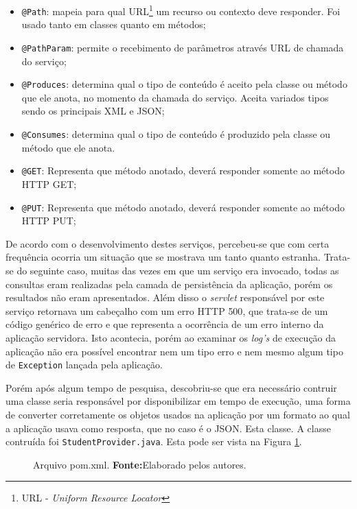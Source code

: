 	\begin{itemize}
	  \item \texttt{@Path}: mapeia para qual URL\footnote{URL - \textit{Uniform
	  Resource Locator}} um recurso ou contexto deve responder. Foi usado tanto em
	  classes quanto em métodos;
	  \item \texttt{@PathParam}: permite o recebimento de parâmetros através URL de
	  chamada do serviço;
	  \item \texttt{@Produces}: determina qual o tipo de conteúdo é aceito pela
	  classe ou método que ele anota, no momento da chamada do serviço. Aceita
	  variados tipos sendo os principais XML e JSON;
	  \item \texttt{@Consumes}: determina qual o tipo de conteúdo é produzido pela
	  classe ou método que ele anota. 
	  \item \texttt{@GET}: Representa que método anotado, deverá responder somente
	  ao método HTTP GET;
	  \item \texttt{@PUT}: Representa que método anotado, deverá responder somente
	  ao método HTTP PUT;
	\end{itemize}
	
	\par De acordo com o desenvolvimento destes serviços, percebeu-se que com certa
frequência ocorria um situação que se mostrava um tanto quanto estranha.
Trata-se do seguinte caso, muitas das vezes em que um serviço era invocado,
todas as consultas eram realizadas pela camada de persistência da aplicação,
porém os resultados não eram apresentados. Além disso o \textit{servlet}
responsável por este serviço retornava um cabeçalho com um erro HTTP {500}, que
trata-se de um código genérico de erro e que representa a ocorrência de um erro
interno da aplicação servidora. Isto acontecia, porém ao examinar os
\textit{log's} de execução da aplicação não era possível  encontrar nem um tipo
erro e nem mesmo algum tipo de \texttt{Exception} lançada pela aplicação. 
	
	\par Porém após algum tempo de pesquisa, descobriu-se que era necessário
contruir uma classe seria responsável por disponibilizar em tempo de execução,
uma forma de converter corretamente os objetos  usados na aplicação por um
formato ao qual a aplicação usava como resposta, que no caso é o JSON. Esta
classe. A classe contruída foi \texttt{StudentProvider.java}. Esta pode ser
vista na Figura \ref{fig:desws27}.

	\begin{figure}[h!]
		
		\caption[Arquivo \texttt{pom.xml}]{Arquivo pom.xml.
		\textbf{Fonte:}Elaborado pelos autores.}
		\label{fig:desws27}
	\end{figure}
	
